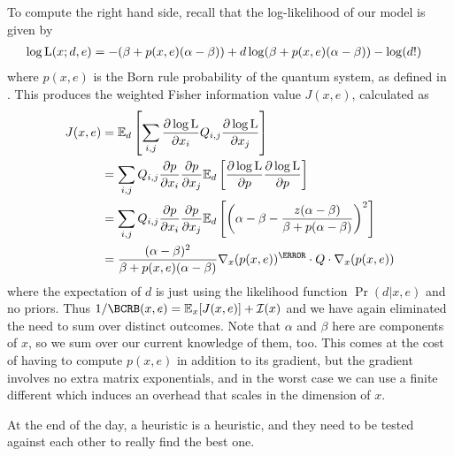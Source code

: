 \documentclass[aps,nofootinbib,prl,twocolumn,superscriptaddress]{revtex4}
\newcommand{\mps}{x}
\newcommand{\eps}{e}
\newcommand{\data}{d}
\begin{document}
To compute the right hand side, recall that the log-likelihood of 
our model is given by
\begin{align}
    \log\Lhood(\mps;\data,\eps)
        &= -(\beta+p(\mps,\eps)(\alpha-\beta)) 
            + \data\log(\beta+p(\mps,\eps)(\alpha-\beta))
            - \log(\data!)
\end{align}
where $p(\mps,\eps)$ is the Born rule probability of the quantum 
system, as defined in \TODO.
This produces the weighted Fisher information value $J(\mps,\eps)$,
calculated as
\begin{align}
    J(\mps,\eps) &= \expect_\data \left[
            \sum_{i,j} 
            \frac{\partial\log\Lhood}{\partial\mps_i}Q_{i,j}
            \frac{\partial\log\Lhood}{\partial\mps_j} 
        \right] \nonumber \\
        &= \sum_{i,j} Q_{i,j}
        \frac{\partial p}{\partial\mps_i}
        \frac{\partial p}{\partial\mps_j}
        \expect_\data \left[
            \frac{\partial\log\Lhood}{\partial p}
            \frac{\partial\log\Lhood}{\partial p}
        \right] \nonumber \\
        &= \sum_{i,j} Q_{i,j}
        \frac{\partial p}{\partial\mps_i}
        \frac{\partial p}{\partial\mps_j}
        \expect_\data \left[
            \left(
                \alpha-\beta-\frac{z(\alpha-\beta)}{\beta+p(\alpha-\beta)}
            \right)^2
        \right] \nonumber \\
        &= \frac{(\alpha-\beta)^2}{\beta+p(\mps,\eps)(\alpha-\beta)}
            \nabla_\mps(p(\mps,\eps))^\T\cdot Q\cdot \nabla_\mps(p(\mps,\eps))
\end{align}
where the expectation of $\data$ is just using the likelihood function
$\Pr(\data|\mps,\eps)$ and no priors.
Thus $1/\BCRB(\mps,\eps)=\expect_\mps [J(\mps,\eps)]+\mathcal{I}(\mps)$
and we have again eliminated the need to sum over distinct outcomes.
Note that $\alpha$ and $\beta$ here are components of $\mps$, so we
sum over our current knowledge of them, too.
This comes at the cost of having to compute $p(\mps,\eps)$ in addition
to its gradient, but the gradient involves no extra matrix exponentials,
and in the worst case we can use a finite different which induces 
an overhead that scales in the dimension of $\mps$.

At the end of the day, a heuristic is a heuristic, and they need to 
be tested against each other to really find the best one.
\end{document}
